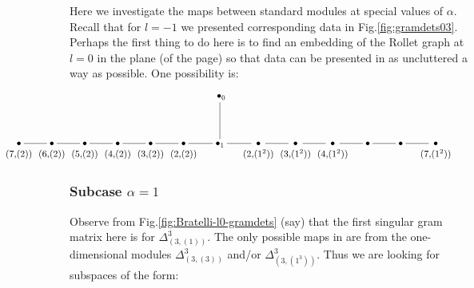 \documentclass{article}
\newcommand{\ppm}[1]{\textcolor{red}{#1}}
\theoremstyle{definition}
\numberwithin{equation}{subsection}
\begin{document}
Here we investigate the maps between standard modules at special values of $\alpha$. 
Recall that for $l=-1$ we presented corresponding data in Fig.\ref{fig:gramdets03}.
Perhaps the first thing to do here is to find an embedding of the Rollet graph at $l=0$ in the plane (of the page) so that data can be presented in as uncluttered a way as possible. One possibility is:
\newcommand{\ver}[1]{{\!\!\!\!\!\!\begin{array}{c} { } \\ \bullet \\ \!\!\!\! \scriptsize{#1} \!\!\!\! \end{array}\!\!\!\!\!\!}}
\[
\hspace{-2.1cm} 
\xymatrix{
   &&&&&& \;\bullet_0 \ar@{-}[d] \\
\ver{(7,\!(2))} \ar@{-}[r] & 
\ver{(6,\!(2))} \ar@{-}[r] & 
\ver{(5,\!(2))} \ar@{-}[r] & 
\ver{(4,\!(2))} \ar@{-}[r] & 
\ver{(3,\!(2))} \ar@{-}[r] & 
\ver{(2,\!(2))} \ar@{-}[r] & 
\bullet_1 \ar@{-}[r] & 
\ver{(2,\!(1^2))} \ar@{-}[r] & 
\ver{(3,\!(1^2))} \ar@{-}[r] & 
\ver{(4,\!(1^2))} \ar@{-}[r] & 
\bullet \ar@{-}[r] & 
\bullet \ar@{-}[r] & 
\ver{(7,\!(1^2))} & 
}
\]



\subsubsection{Subcase $\alpha =1$}  \label{ss:alph1}

Observe from Fig.\ref{fig:Bratelli-l0-gramdets} (say) that 
the first singular gram matrix here is for  $\Delta^{3}_{(3,(1))}$. 
The only possible maps in are from the one-dimensional modules 
$\Delta^{3}_{(3,(3))}$ and/or $\Delta^{3}_{(3,(1^3))}$. 
Thus we are looking for subspaces of the form:

\newcommand{\IU}{
\raisebox{-.32cm}{
\begin{tikzpicture}
     \draw (0,0) -- (2,0) ;
     \draw (.5,0) -- (.5,-1);
     \draw (1,0) .. controls (1,-.5) and (1.5,-.5) .. (1.5,0) ;
     \draw (1,-1) .. controls (1,-.5) and (1.5,-.5) .. (1.5,-1) ;
 \draw (0,-1) -- (2,-1);
 \end{tikzpicture}
}}
\newcommand{\UI}{
\raisebox{-.32cm}{
\begin{tikzpicture}
     \draw (0,0) -- (2,0) ;
     \draw (1.5,0) -- (1.5,-1);
     \draw (.5,0) .. controls (.5,-.5) and (1,-.5) .. (1,0) ;
     \draw (.5,-1) .. controls (.5,-.5) and (1,-.5) .. (1,-1) ;
 \draw (0,-1) -- (2,-1);
 \end{tikzpicture}
}}
\newcommand{\SigI}{
\raisebox{-.32cm}{
\begin{tikzpicture}
     \draw (0,0) -- (2,0) ;
     \draw (1.5,0) -- (1.5,-1);
     \draw (.5,0) -- (1,-1) ;
     \draw (.5,-1) -- (1,0) ;
 \draw (0,-1) -- (2,-1);
 \end{tikzpicture}
}}
\end{document}
